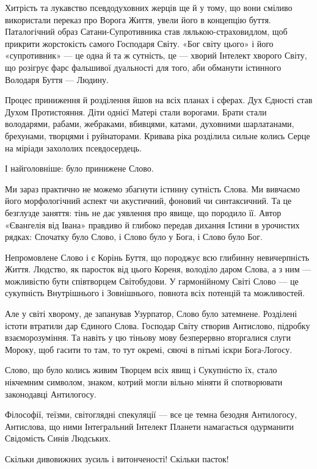 Хитрість та лукавство псевдодуховних жерців ще й у тому, що вони сміливо
використали переказ про Ворога Життя, увели його в концепцію буття.
Паталогічний образ Сатани-Супротивника став лялькою-страховидлом, щоб прикрити
жорстокість самого Господаря Світу. «Бог світу цього» і його «супротивник» — це
одна й та ж сутність, це — хворий Інтелект хворого Світу, що розігрує фарс
фальшивої дуальності для того, аби обманути істинного Володаря Буття — Людину.


Процес приниження й розділення йшов на всіх планах і сферах. Дух Єдності став
Духом Протистояння. Діти однієї Матері стали ворогами. Брати стали володарями,
рабами, жебраками, вбивцями, катами, духовними шарлатанами, брехунами, творцями
і руйнаторами. Кривава ріка розділила сильне колись Серце на міріади захололих
псевдосердець.

І найголовніше: було принижене Слово.

Ми зараз практично не можемо збагнути істинну сутність Слова. Ми вивчаємо його
морфологічний аспект чи акустичний, фоновий чи синтаксичний. Та це безглузде
заняття: тінь не дає уявлення про явище, що породило її. Автор «Євангелія від
Івана» правдиво й глибоко передав дихання Істини в урочистих рядках: Спочатку
було Слово, і Слово було у Бога, і Слово було Бог.

Непромовлене Слово і є Корінь Буття, що породжує всю глибинну невичерпність
Життя. Людство, як паросток від цього Кореня, володіло даром Слова, а з ним —
можливістю бути співтворцем Світобудови. У гармонійному Світі Слово — це
сукупність Внутрішнього і Зовнішнього, повнота всіх потенцій та можливостей.

Але у світі хворому, де запанував Узурпатор, Слово було затемнене. Розділені
істоти втратили дар Єдиного Слова. Господар Світу створив Антислово, підробку
взаєморозуміння. Та навіть у цю тіньову мову безперервно вторгалися слуги
Мороку, щоб гасити то там, то тут окремі, сяючі в пітьмі іскри Бога-Логосу.

Слово, що було колись живим Творцем всіх явищ і Сукупністю їх, стало нікчемним
символом, знаком, котрий могли вільно міняти й спотворювати законодавці
Антилогосу.

Філософії, теїзми, світоглядні спекуляції — все це темна безодня Антилогосу,
Антислова, що ними Інтегральний Інтелект Планети намагається одурманити
Свідомість Синів Людських.

Скільки дивовижних зусиль і витонченості! Скільки пасток!

